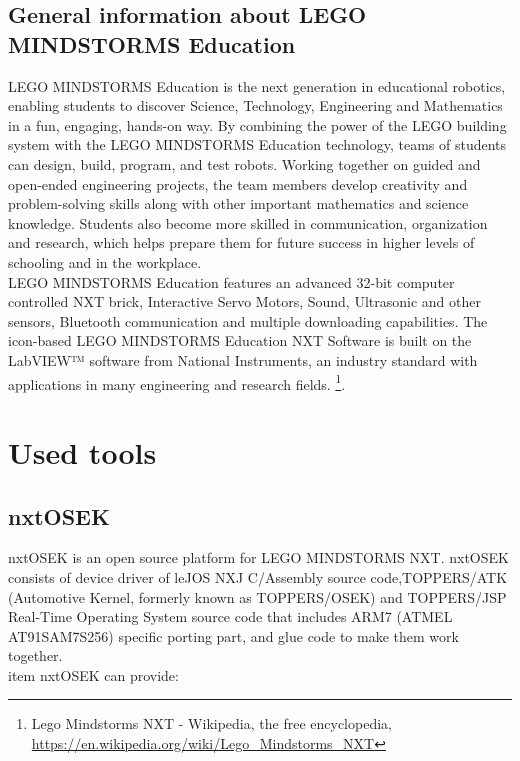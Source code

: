 \documentclass[a4paper,12pt,oneside]{article}
\begin{document}
\subsection{General information about LEGO MINDSTORMS Education}
LEGO MINDSTORMS Education is the next generation in educational robotics, enabling students to discover Science, Technology, Engineering and Mathematics in a fun, engaging, hands-on way. By combining the power of the LEGO building system with the LEGO MINDSTORMS Education technology, teams of students can design, build, program, and test robots. Working together on guided and open-ended engineering projects, the team members develop creativity and problem-solving skills along with other important mathematics and science knowledge. Students also become more skilled in communication, organization and research, which helps prepare them for future success in higher levels of schooling and in the workplace. \\ LEGO MINDSTORMS Education features an advanced 32-bit computer controlled NXT brick, Interactive Servo Motors, Sound, Ultrasonic and other sensors, Bluetooth communication and multiple downloading capabilities. The icon-based LEGO MINDSTORMS Education NXT Software is built on the LabVIEW™ software from National Instruments, an industry standard with applications in many engineering and research fields. \footnote{Lego Mindstorms NXT - Wikipedia, the free encyclopedia, \url{https://en.wikipedia.org/wiki/Lego_Mindstorms_NXT}}.



\section{Used tools}
\subsection{nxtOSEK}
nxtOSEK is an open source platform for LEGO MINDSTORMS NXT. nxtOSEK consists of device driver of leJOS NXJ C/Assembly source code,TOPPERS/ATK (Automotive Kernel, formerly known as TOPPERS/OSEK) and TOPPERS/JSP Real-Time Operating System source code that includes ARM7 (ATMEL AT91SAM7S256) specific porting part, and glue code to make them work together. 
\\
item nxtOSEK can provide:
\end{document}
